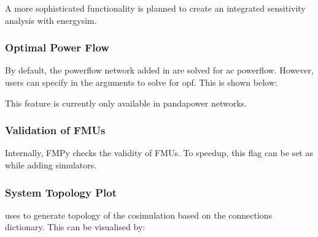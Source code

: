 \documentclass[letterpaper,10pt,english]{sphinxmanual}
\begin{document}
A more sophisticated functionality is planned to create an integrated sensitivity analysis with energysim.


\subsubsection{Optimal Power Flow}
\label{\detokenize{energysim_features:optimal-power-flow}}
By default, the powerflow network added in  are solved for ac powerflow. However, users can specify in the  arguments to solve for opf. This is shown below:

\begin{sphinxVerbatim}[commandchars=\\\{\}]
     
             \PYG{p}{[}\PYG{p}{]} \PYG{p}{[}  \PYG{p}{]}
           
\end{sphinxVerbatim}

This feature is currently only available in pandapower networks.


\subsubsection{Validation of FMUs}
\label{\detokenize{energysim_features:validation-of-fmus}}
Internally, FMPy checks the validity of FMUs. To speedup, this flag can be set as  while adding simulators.


\subsubsection{System Topology Plot}
\label{\detokenize{energysim_features:system-topology-plot}}
 uses  to generate topology of the cosimulation based on the connections dictionary. This can be visualised by:
\end{document}
